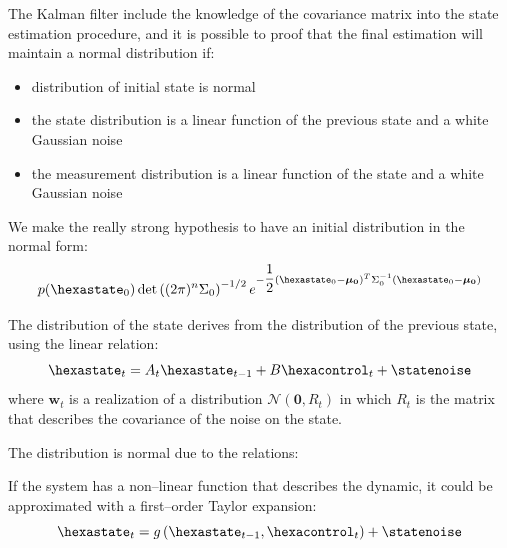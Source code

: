 The Kalman filter include the knowledge of the covariance matrix into the state estimation procedure\citep{thrun2005probabilistic}, and it is possible to proof that the final estimation will maintain a normal distribution if:
\begin{itemize}
\item distribution of initial state is normal
\item the state distribution is a linear function of the previous state and a white Gaussian noise
\item the measurement distribution  is a linear function of the state and a white Gaussian noise
\end{itemize}

We make the really strong hypothesis to have an initial distribution in the normal form:
\begin{equation}
p(\hexastate_0) \det\braces{(2\pi)^{n}\Sigma_0}^{-1/2} e^{-\dfrac{1}{2}\braces{\hexastate_0 - \boldsymbol{\mu_0}}^T \Sigma_{0}^{-1}\braces{\hexastate_0 - \boldsymbol{\mu_0}}}
\end{equation}

The distribution of the state derives from the distribution of the previous state, using the linear relation:
\begin{equation}
\hexastate_t = A_t \hexastate_{t-1} + B \hexacontrol_t + \statenoise
\end{equation}
where ${\mathbf{w}_t}$ is a realization of a distribution ${\mathcal{N}(\mathbf{0},R_t)}$ in which $R_t$ is the matrix that describes the covariance of the noise on the state.

The distribution is normal due to the relations:

If the system has a non--linear function that describes the dynamic, it could be approximated with a first--order Taylor expansion:
\begin{equation}
\hexastate_t = g\braces{\hexastate_{t-1},\hexacontrol_t} + \statenoise
\end{equation}

